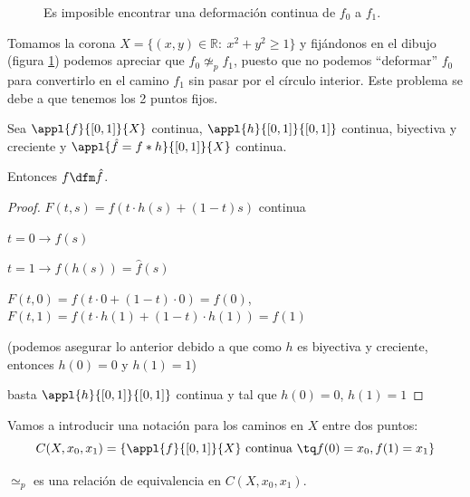 \documentclass{apuntes}
\begin{document}
\begin{example}

\begin{figure}[hbtp]
\caption{Es imposible encontrar una deformación continua de $f_0$ a $f_1$.}
\label{figDefmImposible}
\end{figure}

Tomamos la corona $X = \{(x,y) ∈ ℝ : \ x^2+y^2≥1\}$ y fijándonos en el dibujo (figura \ref{figDefmImposible}) podemos apreciar que $f_0 \not\simeq_p f_1$, puesto que no podemos ``deformar'' $f_0$ para convertirlo en el camino $f_1$ sin pasar por el círculo interior. Este problema se debe a que tenemos los 2 puntos fijos.
\end{example}


\begin{lemma} Sea $\appl{f}{[0,1]}{X}$ continua, $\appl{h}{[0,1]}{[0,1]}$ continua, biyectiva y creciente y $\appl{\hat{f} = f \ast h}{[0,1]}{X}$ continua.

Entonces $f \dfm \hat{f}$.
\end{lemma}

\begin{proof}

$F(t,s) = f(t·h(s) + (1-t) s)$ continua

$t = 0 \to f(s)$

$t = 1 \to f(h(s)) = \hat{f}(s)$

$F(t,0) = f(t·0 + (1-t)·0) = f(0)$, $F(t, 1) = f(t·h(1) + (1 - t)·h(1)) = f(1)$

(podemos asegurar lo anterior debido a que como $h$ es biyectiva y creciente, entonces $h(0) = 0$ y $h(1) = 1$)

\obs basta $\appl{h}{[0,1]}{[0,1]}$ continua y tal que $h(0)=0$, $h(1)=1$
\end{proof}


Vamos a introducir una notación para los caminos en $X$ entre dos puntos: \[ C(X, x_0, x_1) = \{ \appl{f}{[0,1]}{X} \text{ continua } \tq f(0) = x_0, f(1) = x_1 \}\]

\begin{prop} $\simeq_p$ es una relación de equivalencia en $C(X, x_0, x_1)$.
\end{prop}
\end{document}
